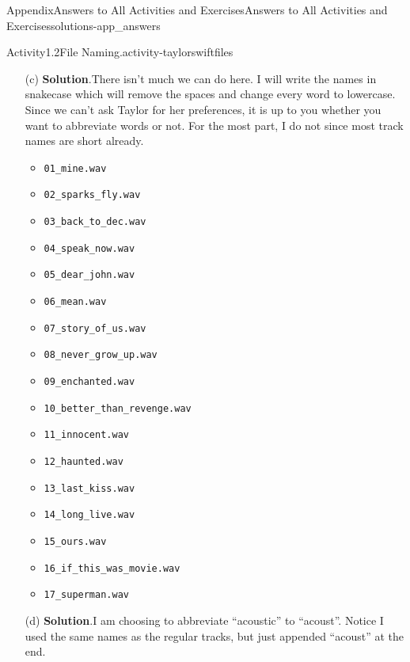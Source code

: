 \documentclass[oneside,10pt,]{book}
\newcommand{\blocktitlefont}{\relax}
\newcommand{\mono}[1]{\texttt{#1}}
\begin{document}
\begin{solutions-chapter}{Appendix}{Answers to All Activities and Exercises}{}{Answers to All Activities and Exercises}{}{}{solutions-app_answers}
\begin{activitysolution}{Activity}{1.2}{File Naming.}{activity-taylorswiftfiles}
\begin{enumerate}[font=\bfseries,label=(\alph*),ref=\alph*]
\begin{enumerate}[label=\arabic*]
\item{}``Regular'' album tracks%
\item{}Acoustic tracks%
\item{}The last track%
\end{enumerate}
%
\item[(c)]\noindent\textbf{\blocktitlefont Solution}.\hypertarget{solution-taylorswiftfiles-f-b-back}{}\quad{}There isn't much we can do here. I will write the names in snake\textunderscore{}case which will remove the spaces and change every word to lowercase. Since we can't ask Taylor for her preferences, it is up to you whether you want to abbreviate words or not. For the most part, I do not since most track names are short already.%
\begin{multicols}{2}
\begin{itemize}[label=\textbullet]
\item{}\mono{01\_mine.wav}%
\item{}\mono{02\_sparks\_fly.wav}%
\item{}\mono{03\_back\_to\_dec.wav}%
\item{}\mono{04\_speak\_now.wav}%
\item{}\mono{05\_dear\_john.wav}%
\item{}\mono{06\_mean.wav}%
\item{}\mono{07\_story\_of\_us.wav}%
\item{}\mono{08\_never\_grow\_up.wav}%
\item{}\mono{09\_enchanted.wav}%
\item{}\mono{10\_better\_than\_revenge.wav}%
\item{}\mono{11\_innocent.wav}%
\item{}\mono{12\_haunted.wav}%
\item{}\mono{13\_last\_kiss.wav}%
\item{}\mono{14\_long\_live.wav}%
\item{}\mono{15\_ours.wav}%
\item{}\mono{16\_if\_this\_was\_movie.wav}%
\item{}\mono{17\_superman.wav}%
\end{itemize}
\end{multicols}
%
\item[(d)]\noindent\textbf{\blocktitlefont Solution}.\hypertarget{solution-taylorswiftfiles-g-b-back}{}\quad{}I am choosing to abbreviate ``acoustic'' to ``acoust''. Notice I used the same names as the regular tracks, but just appended ``\textunderscore{}acoust'' at the end.%

\end{enumerate}
\end{activitysolution}
\end{solutions-chapter}
\end{document}
